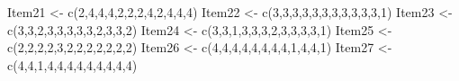 \documentclass[
  english,
]{book}
\newenvironment{Shaded}{\begin{snugshade}}{\end{snugshade}}
\newcommand{\DecValTok}[1]{\textcolor[rgb]{0.00,0.00,0.81}{#1}}
\newcommand{\FunctionTok}[1]{\textcolor[rgb]{0.00,0.00,0.00}{#1}}
\newcommand{\NormalTok}[1]{#1}
\newcommand{\OtherTok}[1]{\textcolor[rgb]{0.56,0.35,0.01}{#1}}
\begin{document}
\begin{Shaded}
\begin{Highlighting}[]
\NormalTok{Item21 }\OtherTok{\textless{}{-}} \FunctionTok{c}\NormalTok{(}\DecValTok{2}\NormalTok{,}\DecValTok{4}\NormalTok{,}\DecValTok{4}\NormalTok{,}\DecValTok{4}\NormalTok{,}\DecValTok{2}\NormalTok{,}\DecValTok{2}\NormalTok{,}\DecValTok{2}\NormalTok{,}\DecValTok{4}\NormalTok{,}\DecValTok{2}\NormalTok{,}\DecValTok{4}\NormalTok{,}\DecValTok{4}\NormalTok{,}\DecValTok{4}\NormalTok{)}
\NormalTok{Item22 }\OtherTok{\textless{}{-}} \FunctionTok{c}\NormalTok{(}\DecValTok{3}\NormalTok{,}\DecValTok{3}\NormalTok{,}\DecValTok{3}\NormalTok{,}\DecValTok{3}\NormalTok{,}\DecValTok{3}\NormalTok{,}\DecValTok{3}\NormalTok{,}\DecValTok{3}\NormalTok{,}\DecValTok{3}\NormalTok{,}\DecValTok{3}\NormalTok{,}\DecValTok{3}\NormalTok{,}\DecValTok{3}\NormalTok{,}\DecValTok{1}\NormalTok{)}
\NormalTok{Item23 }\OtherTok{\textless{}{-}} \FunctionTok{c}\NormalTok{(}\DecValTok{3}\NormalTok{,}\DecValTok{3}\NormalTok{,}\DecValTok{2}\NormalTok{,}\DecValTok{3}\NormalTok{,}\DecValTok{3}\NormalTok{,}\DecValTok{3}\NormalTok{,}\DecValTok{3}\NormalTok{,}\DecValTok{3}\NormalTok{,}\DecValTok{2}\NormalTok{,}\DecValTok{3}\NormalTok{,}\DecValTok{3}\NormalTok{,}\DecValTok{2}\NormalTok{)}
\NormalTok{Item24 }\OtherTok{\textless{}{-}} \FunctionTok{c}\NormalTok{(}\DecValTok{3}\NormalTok{,}\DecValTok{3}\NormalTok{,}\DecValTok{1}\NormalTok{,}\DecValTok{3}\NormalTok{,}\DecValTok{3}\NormalTok{,}\DecValTok{3}\NormalTok{,}\DecValTok{2}\NormalTok{,}\DecValTok{3}\NormalTok{,}\DecValTok{3}\NormalTok{,}\DecValTok{3}\NormalTok{,}\DecValTok{3}\NormalTok{,}\DecValTok{1}\NormalTok{)}
\NormalTok{Item25 }\OtherTok{\textless{}{-}} \FunctionTok{c}\NormalTok{(}\DecValTok{2}\NormalTok{,}\DecValTok{2}\NormalTok{,}\DecValTok{2}\NormalTok{,}\DecValTok{2}\NormalTok{,}\DecValTok{3}\NormalTok{,}\DecValTok{2}\NormalTok{,}\DecValTok{2}\NormalTok{,}\DecValTok{2}\NormalTok{,}\DecValTok{2}\NormalTok{,}\DecValTok{2}\NormalTok{,}\DecValTok{2}\NormalTok{,}\DecValTok{2}\NormalTok{)}
\NormalTok{Item26 }\OtherTok{\textless{}{-}} \FunctionTok{c}\NormalTok{(}\DecValTok{4}\NormalTok{,}\DecValTok{4}\NormalTok{,}\DecValTok{4}\NormalTok{,}\DecValTok{4}\NormalTok{,}\DecValTok{4}\NormalTok{,}\DecValTok{4}\NormalTok{,}\DecValTok{4}\NormalTok{,}\DecValTok{4}\NormalTok{,}\DecValTok{1}\NormalTok{,}\DecValTok{4}\NormalTok{,}\DecValTok{4}\NormalTok{,}\DecValTok{1}\NormalTok{)}
\NormalTok{Item27 }\OtherTok{\textless{}{-}} \FunctionTok{c}\NormalTok{(}\DecValTok{4}\NormalTok{,}\DecValTok{4}\NormalTok{,}\DecValTok{1}\NormalTok{,}\DecValTok{4}\NormalTok{,}\DecValTok{4}\NormalTok{,}\DecValTok{4}\NormalTok{,}\DecValTok{4}\NormalTok{,}\DecValTok{4}\NormalTok{,}\DecValTok{4}\NormalTok{,}\DecValTok{4}\NormalTok{,}\DecValTok{4}\NormalTok{,}\DecValTok{4}\NormalTok{)}

\end{Highlighting}
\end{Shaded}
\end{document}

